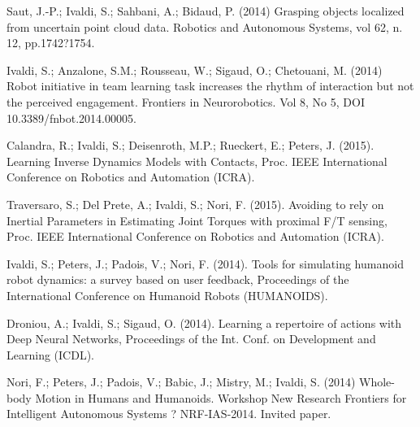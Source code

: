 Saut, J.-P.; Ivaldi, S.; Sahbani, A.; Bidaud, P.  (2014) Grasping objects localized from uncertain point cloud data. Robotics and Autonomous Systems, vol 62, n. 12, pp.1742?1754.

Ivaldi, S.; Anzalone, S.M.; Rousseau, W.; Sigaud, O.; Chetouani, M. (2014) Robot initiative in team learning task increases the rhythm of interaction but not the perceived engagement. Frontiers in Neurorobotics. Vol 8, No 5, DOI 10.3389/fnbot.2014.00005.

Calandra, R.; Ivaldi, S.; Deisenroth, M.P.; Rueckert, E.; Peters, J. (2015). Learning Inverse Dynamics Models with Contacts, Proc. IEEE International Conference on Robotics and Automation (ICRA). 

Traversaro, S.; Del Prete, A.; Ivaldi, S.; Nori, F. (2015). Avoiding to rely on Inertial Parameters in Estimating Joint Torques with proximal F/T sensing, Proc. IEEE International Conference on Robotics and Automation (ICRA). 

Ivaldi, S.; Peters, J.; Padois, V.; Nori, F. (2014). Tools for simulating humanoid robot dynamics: a survey based on user feedback, Proceedings of the International Conference on Humanoid Robots (HUMANOIDS).

Droniou, A.; Ivaldi, S.; Sigaud, O. (2014). Learning a repertoire of actions with Deep Neural Networks, Proceedings of the Int. Conf. on Development and Learning (ICDL).

Nori, F.;  Peters, J.; Padois, V.; Babic, J.; Mistry, M.; Ivaldi, S.  (2014) Whole-body Motion in Humans and Humanoids. Workshop New Research Frontiers for Intelligent Autonomous Systems ? NRF-IAS-2014. Invited paper.


